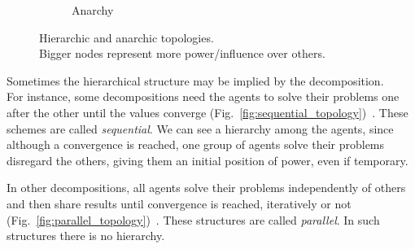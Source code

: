 \documentclass[../main.tex]{subfiles}
\begin{document}
\begin{figure}[h]
\begin{subfigure}[b]{.45\textwidth}
{
  }
  \caption{Anarchy}\label{fig:anarchy_topology}
\end{subfigure}
\caption[Hierarchic and anarchic topologies.]{Hierarchic and anarchic topologies. \\Bigger nodes represent more power/influence over others.}\label{fig:hierarchic_anarchic}
\end{figure}


Sometimes the hierarchical structure may be implied by the decomposition.
\\For instance, some decompositions need the agents to solve their problems one after the other until the values converge (Fig.~\ref{fig:sequential_topology})~\cite{LiuEtAl2009a}.
These schemes are called \emph{sequential}.
We can see a hierarchy among the agents, since although a convergence is reached, one group of agents solve their problems disregard the others, giving them an initial position of power, even if temporary.

In other decompositions, all agents solve their problems independently of others and then share results until convergence is reached, iteratively or not (Fig.~\ref{fig:parallel_topology})~\cite{LiuEtAl2010}.
These structures are called \emph{parallel}.
In such structures there is no hierarchy.
\end{document}
